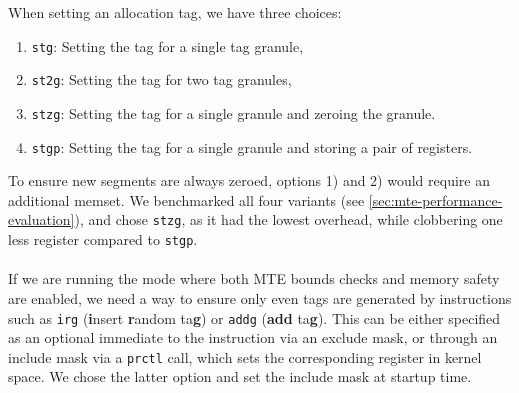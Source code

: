 When setting an allocation tag, we have three choices:
\begin{enumerate}
  \item \texttt{stg}: Setting the tag for a single tag granule,
  \item \texttt{st2g}: Setting the tag for two tag granules,
  \item \texttt{stzg}: Setting the tag for a single granule and zeroing the granule.
  \item \texttt{stgp}: Setting the tag for a single granule and storing a pair of registers.
\end{enumerate}

To ensure new segments are always zeroed, options 1) and 2) would require an additional memset.
We benchmarked all four variants (see \cref{sec:mte-performance-evaluation}), and chose \texttt{stzg}, as it had the lowest overhead, while clobbering one less register compared to \texttt{stgp}.

\paragraph{}
If we are running the mode where both \ac{MTE} bounds checks and memory safety are enabled, we need a way to ensure only even tags are generated by instructions such as \texttt{irg} (\textbf{i}nsert \textbf{r}andom ta\textbf{g}) or \texttt{addg} (\textbf{add} ta\textbf{g}).
This can be either specified as an optional immediate to the instruction via an exclude mask, or through an include mask via a \texttt{prctl} call, which sets the corresponding register in kernel space.
We chose the latter option and set the include mask at startup time.

